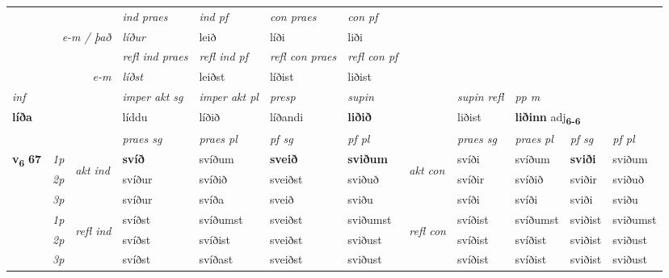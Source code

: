 \begin{longtable}[l]{X>{\footnotesize\itshape}llXXXXlXXXX}
   && &  \textit{ind praes} & \textit{ind pf} & \textit{con praes} & \textit{con pf} \\*
\multicolumn{3}{r}{\textit{e-m / það}} & líður & leið & líði & liði \\*

\cmidrule{4-7}
 & && \textit{refl ind praes} & \textit{refl ind pf} & \textit{refl con praes} & \textit{refl con pf} \\*
\multicolumn{3}{r}{\textit{e-m}}& líðst & leiðst & líðist & liðist \\*

\cmidrule{4-7}
   {\textit{inf}} & &  & \textit{imper akt sg} & \textit{imper akt pl}   & \textit{presp} & \textit{supin} && \textit{supin refl} & \textit{pp m} \\*
  {\textbf{líða}} & && líddu  & líðið   & líðandi &  \textbf{liðið} && liðist & \multicolumn{2}{l}{\textbf{liðinn} adj\textbf{\textsubscript{6-6}}} \\*

\midrule

 & &   & \textit{praes sg}  & \textit{praes pl}    & \textit{ pf sg} & \textit{pf pl} & & \textit{praes sg}  & \textit{praes pl}    & \textit{pf sg} & \textit{pf pl }  \\ \cmidrule{4-7} \cmidrule{9-12}
 \multirow{2}{*}{{{\textbf{v{\textsubscript{6}}} \Large{\textbf{67}}}}}  & 1p & \multirow{3}{*}{\begin{turn}{90}\textit{akt ind}\end{turn}} & \textbf{svíð} & svíðum & \textbf{sveið} & \textbf{sviðum} & \multirow{3}{*}{\begin{turn}{90}\textit{akt con}\end{turn}} &svíði & svíðum & \textbf{sviði} & sviðum\\*
 & 2p &  &  svíður  & svíðið & sveiðst & sviðuð & & svíðir & svíðið & sviðir & sviðuð \\*
 & 3p &  & svíður & svíða & sveið & sviðu & & svíði & svíði& sviði & sviðu \\*
\cmidrule{4-7} \cmidrule{9-12}
 & 1p & \multirow{3}{*}{\begin{turn}{90}\textit{refl ind}\end{turn}}  & svíðst & svíðumst & sveiðst & sviðumst & \multirow{3}{*}{\begin{turn}{90}\textit{refl con}\end{turn}}  &svíðist & svíðumst & sviðist & sviðumst \\*
 & 2p &  & svíðst & svíðist & sveiðst & sviðust & &svíðist & svíðist & sviðist & sviðust \\*
 & 3p  & & svíðst & svíðast & sveiðst & sviðust & & svíðist & svíðist& sviðist & sviðust \\*
\cmidrule{4-7} \cmidrule{9-12}


\end{longtable}
